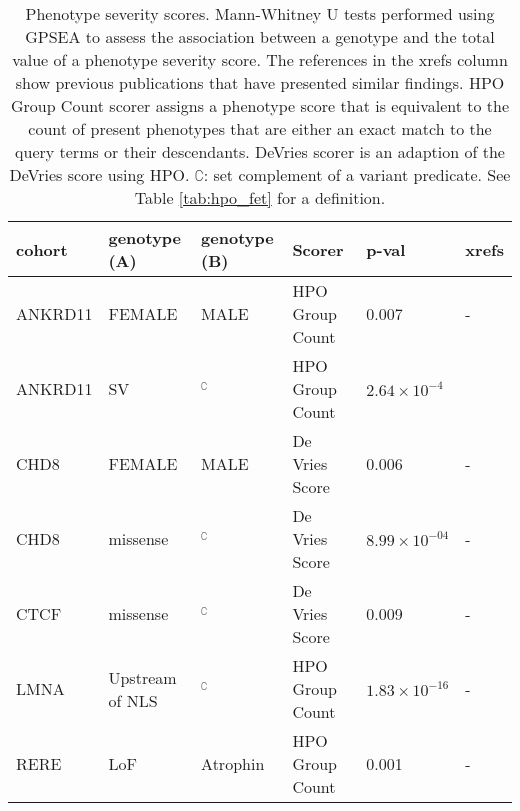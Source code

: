 \clearpage
\newpage


\clearpage
\newpage

\begin{table}
\centering
\toprule
\begin{tabular}{l>{\raggedright}p{2.5cm}>{\raggedright}p{2.5cm}l>{\raggedright}p{2.5cm}l}
\textbf{cohort} & \textbf{genotype (A)} & \textbf{genotype (B)} & \textbf{Scorer} & \textbf{p-val} & \textbf{xrefs}\\
\midrule
ANKRD11 & FEMALE & MALE & HPO Group Count & 0.007 & - \\
ANKRD11	& SV & $^{\complement}$ & HPO Group Count & $2.64\times 10^{-4}$ & \cite{PMID_36446582} \\
CHD8 & FEMALE & MALE & De Vries Score & 0.006 & - \\
CHD8 & missense & $^{\complement}$ & De Vries Score & 	$8.99\times 10^{-04}$ & - \\
CTCF & missense & $^{\complement}$ & De Vries Score & 0.009 & - \\ 
LMNA & Upstream of NLS & $^{\complement}$ & HPO Group Count & $1.83\times 10^{-16}$ & - \\
RERE & LoF & Atrophin & HPO Group Count & 0.001 & -  \\
\hline
\end{tabular}
\caption{Phenotype severity scores. Mann-Whitney U tests performed using GPSEA to assess the association between a genotype and the total value of a phenotype severity score.
The references in the xrefs column show previous publications that have presented similar findings. HPO Group Count scorer assigns a phenotype score that is equivalent to the count of present phenotypes that are either an exact match to the query terms or their descendants. DeVries scorer is an adaption of the DeVries score \cite{PMID_34521999} using HPO. $\complement$: set complement of a variant predicate. See Table \ref{tab:hpo_fet} for a definition.} 
\label{tab:sevscores}
\end{table}


\clearpage
\newpage


